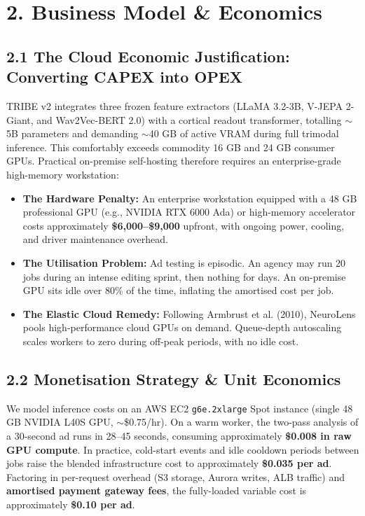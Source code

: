 \documentclass[10pt,a4paper]{article}
\begin{document}
\section*{\textsf{2. Business Model \& Economics}}

\subsection*{\textsf{2.1 The Cloud Economic Justification: Converting CAPEX into OPEX}}
TRIBE v2 integrates three frozen feature extractors (LLaMA 3.2-3B, V-JEPA 2-Giant, and Wav2Vec-BERT 2.0) with a cortical readout transformer, totalling $\sim$5B parameters and demanding $\sim$40 GB of active VRAM during full trimodal inference. This comfortably exceeds commodity 16 GB and 24 GB consumer GPUs. Practical on-premise self-hosting therefore requires an enterprise-grade high-memory workstation:
\begin{itemize}
    \item \textbf{The Hardware Penalty:} An enterprise workstation equipped with a 48 GB professional GPU (e.g., NVIDIA RTX 6000 Ada) or high-memory accelerator costs approximately \textbf{\$6,000--\$9,000} upfront, with ongoing power, cooling, and driver maintenance overhead.
    \item \textbf{The Utilisation Problem:} Ad testing is episodic. An agency may run 20 jobs during an intense editing sprint, then nothing for days. An on-premise GPU sits idle over 80\% of the time, inflating the amortised cost per job.
    \item \textbf{The Elastic Cloud Remedy:} Following Armbrust et al. (2010), NeuroLens pools high-performance cloud GPUs on demand. Queue-depth autoscaling scales workers to zero during off-peak periods, with no idle cost.
\end{itemize}

\subsection*{\textsf{2.2 Monetisation Strategy \& Unit Economics}}
We model inference costs on an AWS EC2 \texttt{g6e.2xlarge} Spot instance (single 48 GB NVIDIA L40S GPU, $\sim$\$0.75/hr). On a warm worker, the two-pass analysis of a 30-second ad runs in 28--45 seconds, consuming approximately \textbf{\$0.008 in raw GPU compute}. In practice, cold-start events and idle cooldown periods between jobs raise the blended infrastructure cost to approximately \textbf{\$0.035 per ad}. Factoring in per-request overhead (S3 storage, Aurora writes, ALB traffic) and \textbf{amortised payment gateway fees}, the fully-loaded variable cost is approximately \textbf{\$0.10 per ad}.
\end{document}
